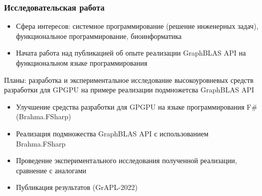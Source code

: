 \documentclass[xcolor=table,aspectratio=169]{beamer}
\begin{document}
\begin{frame}[fragile] \frametitle{Исследовательская работа}
  
    \begin{itemize}
        \item Сфера интересов: системное программирование (решение инженерных задач), функциональное программирование, биоинформатика
        \item Начата работа над публикацией об опыте реализации GraphBLAS API на функциональном языке программирования        
    \end{itemize}
  \pause
  \vfill
  Планы: разработка и экспериментальное исследование высокоуровневых средств разработки для GPGPU на примере реализации подмножетсва GraphBLAS API
  \begin{itemize}
        \item Улучшение средства разработки для GPGPU на языке программирования F\# (Brahma.FSharp)
        \item Реализация подмножества GraphBLAS API с использованием Brahma.FSharp
        \item Проведение экспериментального исследования полученной реализации, сравнение с аналогами
        \item Публикация результатов (GrAPL-2022)
  \end{itemize}

\end{frame}
\end{document}
